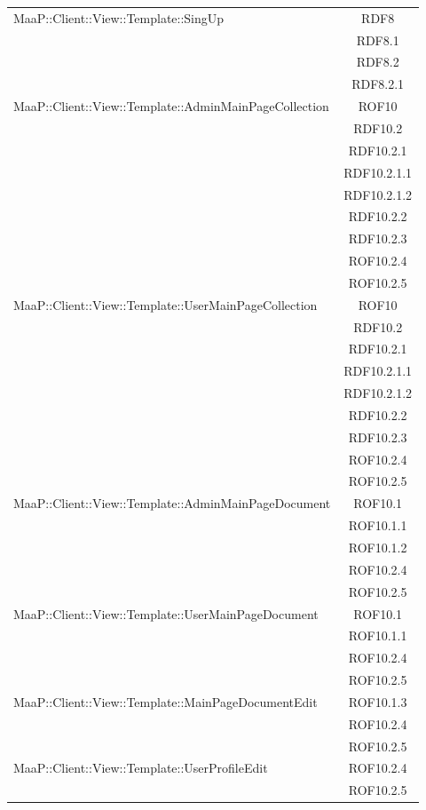 \begin{center}
\begin{longtable}{|p{0.8\linewidth}|c|}
\midrule 
MaaP::Client::View::Template::SingUp
& RDF8\\
& RDF8.1\\
& RDF8.2\\
& RDF8.2.1\\

\midrule 
MaaP::Client::View::Template::AdminMainPageCollection
& ROF10\\
& RDF10.2\\
& RDF10.2.1\\
& RDF10.2.1.1\\
& RDF10.2.1.2\\
& RDF10.2.2\\
& RDF10.2.3\\
& ROF10.2.4\\
& ROF10.2.5\\



\midrule 
MaaP::Client::View::Template::UserMainPageCollection
& ROF10\\
& RDF10.2\\
& RDF10.2.1\\
& RDF10.2.1.1\\
& RDF10.2.1.2\\
& RDF10.2.2\\
& RDF10.2.3\\
& ROF10.2.4\\
& ROF10.2.5\\

\midrule 
MaaP::Client::View::Template::AdminMainPageDocument
& ROF10.1\\
& ROF10.1.1\\
& ROF10.1.2\\
& ROF10.2.4\\
& ROF10.2.5\\


\midrule 
MaaP::Client::View::Template::UserMainPageDocument
& ROF10.1\\
& ROF10.1.1\\
& ROF10.2.4\\
& ROF10.2.5\\


\midrule 
MaaP::Client::View::Template::MainPageDocumentEdit
& ROF10.1.3\\
& ROF10.2.4\\
& ROF10.2.5\\


\midrule 
MaaP::Client::View::Template::UserProfileEdit
& ROF10.2.4\\
& ROF10.2.5\\


\end{longtable}
\end{center}
